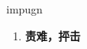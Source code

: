 
\begin{frame}
{\huge impugn}
\begin{center}
\begin{enumerate}\Large
  \item \textbf{责难，抨击}
\end{enumerate}
\end{center}
\end{frame}
